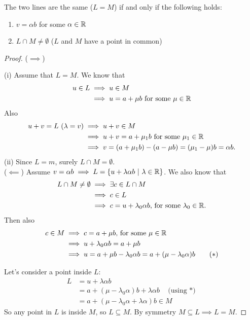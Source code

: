 \documentclass[10pt]{scrartcl}
\begin{document}
\begin{proposition}The two lines are the same ($L = M$) if and only if the following holds:\begin{enumerate}
\item $v = \alpha b$ for some $\alpha \in \mathbb{R}$
\item $L \cap M \neq \emptyset$ ($L$ and $M$ have a point in common) 	
\end{enumerate}
\end{proposition}
\begin{proof}
($\implies$)

(i) Assume that $L= M$. We know that 
\begin{align*}u \in L &\implies u \in M\\ &\implies u = a + \mu b\text{ for some }\mu \in \mathbb{R}\end{align*}
Also \begin{align*}
  u + v = L ~(\lambda = v) &\implies u + v \in M\\ &\implies u + v = a + \mu_1b\text{ for some }\mu_1 \in \mathbb{R}\\ &\implies v = (a+\mu _1b) - (a-\mu b) = (\mu _1 - \mu )b = \alpha b.
\end{align*}
(ii) Since $L=m$, surely $L \cap M = \emptyset$.\\

($\impliedby$) Assume $v = \alpha b \implies L = \{u + \lambda \alpha b ~|~ \lambda \in \mathbb{R}\}$. We also know that
 \begin{align*}
  L \cap M \neq \emptyset &\implies \exists c \in L \cap M\\ &\implies c \in L\\ &\implies c = u + \lambda_0\alpha b\text{, for some }\lambda_0 \in \mathbb{R}.
\end{align*}
Then also \begin{align*}
  c \in M &\implies c = a + \mu b\text{, for some }\mu \in \mathbb{R}\\ &\implies u + \lambda_0 \alpha b = a + \mu b \\&\implies u = a + \mu b - \lambda_0\alpha b = a + (\mu - \lambda_0\alpha)b \tag{$*$}
\end{align*}


Let's consider a point inside $L$:\begin{align*}
  L &= u + \lambda \alpha b \\ &= a + (\mu - \lambda_0 \alpha) b + \lambda \alpha b \quad \mbox{(using $*$)}\\ &= a + (\mu - \lambda_0 \alpha  + \lambda \alpha)b \in M
\end{align*}
 So any point in $L$ is inside $M$, so $L \subseteq M$. By symmetry $M \subseteq L \implies L = M$.
\end{proof}
\end{document}
